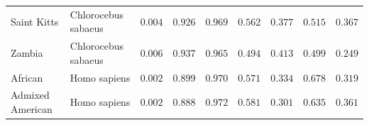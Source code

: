 \documentclass{article}
\providecommand{\DIFaddtex}[1]{{\protect\color{blue}\uwave{#1}}} %
\providecommand{\DIFdeltex}[1]{{\protect\color{red}\sout{#1}}}                      %
\providecommand{\DIFaddFL}[1]{\DIFadd{#1}} %
\providecommand{\DIFdelFL}[1]{\DIFdel{#1}} %
\providecommand{\DIFaddbeginFL}{} %
\providecommand{\DIFaddendFL}{} %
\providecommand{\DIFdelbeginFL}{} %
\providecommand{\DIFdelendFL}{} %
\providecommand{\DIFadd}[1]{\texorpdfstring{\DIFaddtex{#1}}{#1}} %
\providecommand{\DIFdel}[1]{\texorpdfstring{\DIFdeltex{#1}}{}} %
\newcommand{\DIFscaledelfig}{0.5}
\newlength{\DIFdelgraphicswidth} %
\newlength{\DIFdelgraphicsheight} %
\newcommand{\DIFaddincludegraphics}[2][]{{\color{blue}\fbox{\DIFOincludegraphics[#1]{#2}}}} %
\newcommand{\DIFdelincludegraphics}[2][]{%
\sbox{\DIFdelgraphicsbox}{\DIFOincludegraphics[#1]{#2}}%
\settoboxwidth{\DIFdelgraphicswidth}{\DIFdelgraphicsbox} %
\settoboxtotalheight{\DIFdelgraphicsheight}{\DIFdelgraphicsbox} %
\scalebox{\DIFscaledelfig}{%
\parbox[b]{\DIFdelgraphicswidth}{\usebox{\DIFdelgraphicsbox}\\[-\baselineskip] \rule{\DIFdelgraphicswidth}{0em}}\llap{\resizebox{\DIFdelgraphicswidth}{\DIFdelgraphicsheight}{%
\setlength{\unitlength}{\DIFdelgraphicswidth}%
\begin{picture}(1,1)%
\thicklines\linethickness{2pt} %
{\color[rgb]{1,0,0}\put(0,0){\framebox(1,1){}}}%
{\color[rgb]{1,0,0}\put(0,0){\line( 1,1){1}}}%
{\color[rgb]{1,0,0}\put(0,1){\line(1,-1){1}}}%
\end{picture}%
}\hspace*{3pt}}} %
} %
\DeclareRobustCommand{\DIFaddbeginFL}{\DIFOaddbeginFL \let\includegraphics\DIFaddincludegraphics} %
\DeclareRobustCommand{\DIFaddendFL}{\DIFOaddendFL \let\includegraphics\DIFOincludegraphics} %
\DeclareRobustCommand{\DIFdelbeginFL}{\DIFOdelbeginFL \let\includegraphics\DIFdelincludegraphics} %
\DeclareRobustCommand{\DIFdelendFL}{\DIFOaddendFL \let\includegraphics\DIFOincludegraphics} %
\begin{document}
\begin{table}[tb]
\begin{adjustbox}{width=\textwidth}
\begin{tabular}{||l|l|r||r|r||r|r||r|r||}
                \rowcolor{LIGHTGREY} Saint Kitts & Chlorocebus sabaeus & \DIFdelbeginFL \DIFdelFL{$ 0.004$ }\DIFdelendFL \DIFaddbeginFL \DIFaddFL{$1.2\times 10^{5}$ }\DIFaddendFL & \DIFdelbeginFL \DIFdelFL{$ 0.926$ }\DIFdelendFL \DIFaddbeginFL \DIFaddFL{$ 0.936$ }\DIFaddendFL & \DIFdelbeginFL \DIFdelFL{$ 0.969$ }\DIFdelendFL \DIFaddbeginFL \DIFaddFL{$ 0.975$ }\DIFaddendFL & \DIFdelbeginFL \DIFdelFL{$ 0.562$ }\DIFdelendFL \DIFaddbeginFL \DIFaddFL{$ 0.586$ }\DIFaddendFL & \DIFdelbeginFL \DIFdelFL{$ 0.377$ }\DIFdelendFL \DIFaddbeginFL \DIFaddFL{$ 0.402$ }\DIFaddendFL & \DIFdelbeginFL \DIFdelFL{$ 0.515$ }\DIFdelendFL \DIFaddbeginFL \DIFaddFL{$ 0.598$ }\DIFaddendFL & \DIFdelbeginFL \DIFdelFL{$ 0.367$ }\DIFdelendFL \DIFaddbeginFL \DIFaddFL{$ 0.336$ }\DIFaddendFL \\
                \rowcolor{LIGHTGREY} Zambia & Chlorocebus sabaeus & \DIFdelbeginFL \DIFdelFL{$ 0.006$ }\DIFdelendFL \DIFaddbeginFL \DIFaddFL{$1.7\times 10^{5}$ }\DIFaddendFL & \DIFdelbeginFL \DIFdelFL{$ 0.937$ }\DIFdelendFL \DIFaddbeginFL \DIFaddFL{$ 0.945$ }\DIFaddendFL & \DIFdelbeginFL \DIFdelFL{$ 0.965$ }\DIFdelendFL \DIFaddbeginFL \DIFaddFL{$ 0.971$ }\DIFaddendFL & \DIFdelbeginFL \DIFdelFL{$ 0.494$ }\DIFdelendFL \DIFaddbeginFL \DIFaddFL{$ 0.512$ }\DIFaddendFL & \DIFdelbeginFL \DIFdelFL{$ 0.413$ }\DIFdelendFL \DIFaddbeginFL \DIFaddFL{$ 0.432$ }\DIFaddendFL & \DIFdelbeginFL \DIFdelFL{$ 0.499$ }\DIFdelendFL \DIFaddbeginFL \DIFaddFL{$ 0.585$ }\DIFaddendFL & \DIFdelbeginFL \DIFdelFL{$ 0.249$ }\DIFdelendFL \DIFaddbeginFL \DIFaddFL{$ 0.250$ }\DIFaddendFL \\
                African & Homo sapiens & \DIFdelbeginFL \DIFdelFL{$ 0.002$ }\DIFdelendFL \DIFaddbeginFL \DIFaddFL{$5.6\times 10^{4}$ }\DIFaddendFL & \DIFdelbeginFL \DIFdelFL{$ 0.899$ }\DIFdelendFL \DIFaddbeginFL \DIFaddFL{$ 0.911$ }\DIFaddendFL & \DIFdelbeginFL \DIFdelFL{$ 0.970$ }\DIFdelendFL \DIFaddbeginFL \DIFaddFL{$ 0.976$ }\DIFaddendFL & \DIFdelbeginFL \DIFdelFL{$ 0.571$ }\DIFdelendFL \DIFaddbeginFL \DIFaddFL{$ 0.579$ }\DIFaddendFL & \DIFdelbeginFL \DIFdelFL{$ 0.334$ }\DIFdelendFL \DIFaddbeginFL \DIFaddFL{$ 0.325$ }\DIFaddendFL & \DIFdelbeginFL \DIFdelFL{$ 0.678$ }\DIFdelendFL \DIFaddbeginFL \DIFaddFL{$ 0.721$ }\DIFaddendFL & \DIFdelbeginFL \DIFdelFL{$ 0.319$ }\DIFdelendFL \DIFaddbeginFL \DIFaddFL{$ 0.349$ }\DIFaddendFL \\
                Admixed American & Homo sapiens & \DIFdelbeginFL \DIFdelFL{$ 0.002$ }\DIFdelendFL \DIFaddbeginFL \DIFaddFL{$4.5\times 10^{4}$ }\DIFaddendFL & \DIFdelbeginFL \DIFdelFL{$ 0.888$ }\DIFdelendFL \DIFaddbeginFL \DIFaddFL{$ 0.902$ }\DIFaddendFL & \DIFdelbeginFL \DIFdelFL{$ 0.972$ }\DIFdelendFL \DIFaddbeginFL \DIFaddFL{$ 0.978$ }\DIFaddendFL & \DIFdelbeginFL \DIFdelFL{$ 0.581$ }\DIFdelendFL \DIFaddbeginFL \DIFaddFL{$ 0.584$ }\DIFaddendFL & \DIFdelbeginFL \DIFdelFL{$ 0.301$ }\DIFdelendFL \DIFaddbeginFL \DIFaddFL{$ 0.299$ }\DIFaddendFL & \DIFdelbeginFL \DIFdelFL{$ 0.635$ }\DIFdelendFL \DIFaddbeginFL \DIFaddFL{$ 0.690$ }\DIFaddendFL & \DIFdelbeginFL \DIFdelFL{$ 0.361$ }\DIFdelendFL \DIFaddbeginFL \DIFaddFL{$ 0.345$ }\DIFaddendFL \\

\end{tabular}
\end{adjustbox}
\end{table}
\end{document}
